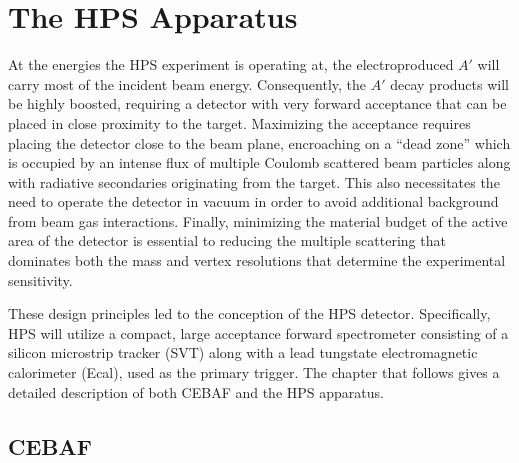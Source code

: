 
\chapter{The HPS Apparatus}


At the energies the HPS experiment is operating at, the 
electroproduced $A'$ will carry most of the incident beam energy.  Consequently,
the $A'$ decay products will be highly boosted, requiring a detector with very
forward acceptance that can be placed in close proximity to the target.
Maximizing the acceptance requires placing the detector close to the beam plane,
encroaching on a ``dead zone'' which is occupied by an intense flux of multiple
Coulomb scattered beam particles along with radiative secondaries originating
from the target.  This also necessitates the need to operate the detector in 
vacuum in order to avoid additional background from beam gas interactions. 
Finally, minimizing the material budget of the active area of the detector is 
essential to reducing the multiple scattering that dominates both the mass and
vertex resolutions that determine the experimental sensitivity.

These design principles led to the conception of the HPS detector.  
Specifically, HPS will utilize a compact, large acceptance forward spectrometer 
consisting of a silicon microstrip tracker (SVT) along with a lead tungstate
electromagnetic calorimeter (Ecal), used as the primary trigger.  The chapter
that follows gives a detailed description of both CEBAF and the HPS apparatus.

\section{CEBAF}

